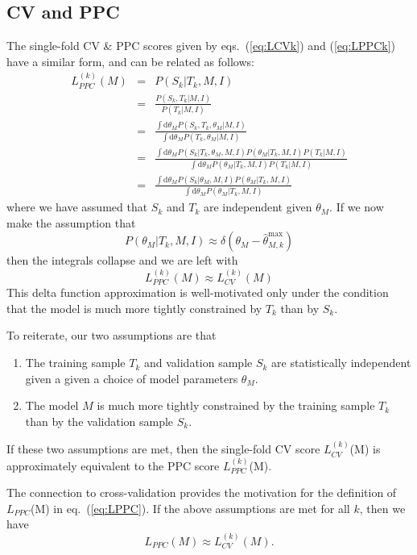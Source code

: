 \documentclass[12pt]{article}
\newcommand{\dd}{\mathrm{d}}
\newcommand{\thetamax}[1]{\ensuremath{\hat{\theta}^{\max}_{#1}}}
\newcommand{\LCVk}[1]{\ensuremath{L^{(k)}_{CV}}(#1)}
\newcommand{\LPPC}[1]{\ensuremath{L_{PPC}}(#1)}
\newcommand{\LPPCk}[1]{\ensuremath{L^{(k)}_{PPC}}(#1)}
\newcommand{\eqn}[1]{eq.~(\ref{eq:#1})}
\newcommand{\eqns}[2]{eqs.~(\ref{eq:#1}) and (\ref{eq:#2})}
\begin{document}
\subsection{CV and PPC}
The single-fold CV \& PPC scores given by \eqns{LCVk}{LPPCk}
have a similar form, and can be related as follows:
\begin{eqnarray}
  \LPPCk{M} &=& P(S_k|T_k,M,I)\\
            &=& \frac{P(S_k,T_k|M,I)}{P(T_k|M,I)}\\
            &=& \frac{\int \dd\theta_M P(S_k,T_k,\theta_M|M,I)}
                     {\int \dd\theta_M P(T_k,\theta_M|M,I)}\\
            &=& \frac{\int \dd\theta_M P(S_k|T_k,\theta_M,M,I)
                                       P(\theta_M|T_k,M,I)P(T_k|M,I)}
                     {\int \dd\theta_M P(\theta_M|T_k,M,I) P(T_k|M,I)}\\
            &=& \frac{\int \dd\theta_M P(S_k|\theta_M,M,I)P(\theta_M|T_k,M,I)}
                     {\int \dd\theta_M P(\theta_M|T_k,M,I)}
\end{eqnarray}
where we have assumed that $S_k$ and $T_k$ are independent given $\theta_M$.
If we now make the assumption that
\begin{equation}
  P(\theta_M|T_k,M,I) \approx \delta(\theta_M - \thetamax{M,k})
\end{equation}
then the integrals collapse and we are left with
\begin{equation}
  \LPPCk{M} \approx \LCVk{M}
\end{equation}
This delta function approximation is well-motivated only under the condition
that the model is much more tightly constrained by $T_k$ than by $S_k$.

To reiterate, our two assumptions are that
\begin{enumerate}
  \item The training sample $T_k$ and validation sample $S_k$ are statistically
    independent given a  given a choice of model parameters $\theta_M$.
  \item The model $M$ is much more tightly constrained by the training sample
    $T_k$ than by the validation sample $S_k$.
\end{enumerate}
If these two assumptions are met, then the single-fold CV score \LCVk{M} is
approximately equivalent to the PPC score \LPPCk{M}.

The connection to cross-validation provides the
motivation for the definition of \LPPC{M} in \eqn{LPPC}.
If the above assumptions are met for all $k$, then we have
\begin{equation}
  \LPPC{M} \approx \LCVk{M}.
\end{equation}
\end{document}
